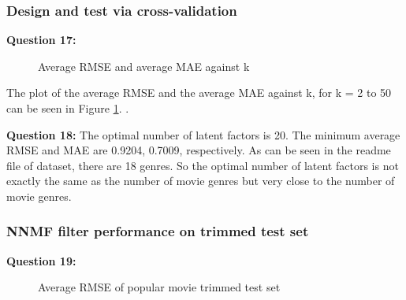 \documentclass{article}
\begin{document}
\subsubsection{Design and test via cross-validation}

\bigbreak \textbf{Question 17:}
\begin{figure}
\centering
{}
\caption{Average RMSE and average MAE against k} \label{Q17}
\end{figure}

The plot of the average RMSE and the average MAE against k, for k = 2 to 50 can be seen in Figure \ref{Q17}.
\newline.

\bigbreak \textbf{Question 18:}
The optimal number of latent factors is 20. The minimum average RMSE and MAE are 0.9204, 0.7009, respectively. As can be seen in the readme file of dataset, there are 18 genres. So the optimal number of latent factors is not exactly the same as the number of movie genres but very close to the number of movie genres.
\newline

\subsubsection{NNMF filter performance on trimmed test set}

\bigbreak \textbf{Question 19:}
\begin{figure}
\centering
{}
\caption{Average RMSE of popular movie trimmed test set} \label{Q19}
\end{figure}
\end{document}
